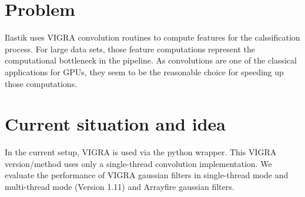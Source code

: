 \documentclass[12pt,a4paper]{article}
\begin{document}
\setlength{\parindent}{0pt}


\section{Problem}
Ilastik uses VIGRA convolution routines to compute features for the calssification process.
For large data sets, those feature computations represent the computational bottleneck in the pipeline. 
As convolutions are one of the classical applications for GPUs, they seem to be the reasonable choice for speeding up those computations. 

\section{Current situation and idea}
In the current setup, VIGRA is used via the python wrapper.
This VIGRA version/method uses only a single-thread convolution implementation.
We evaluate the performance of VIGRA gaussian filters in single-thread mode and multi-thread mode (Version 1.11) and Arrayfire gaussian filters.
\end{document}
